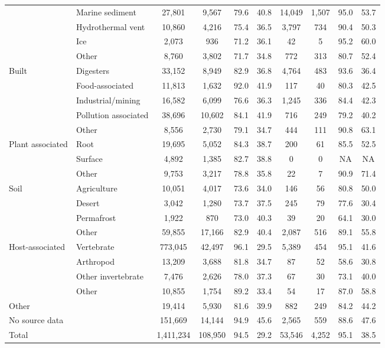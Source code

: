 \documentclass[]{article}
\begin{document}
\begin{table}[!ht]
{\begin{tabular}{llcccccccc}
   & Marine sediment &    27,801 &   9,567 & 79.6 & 40.8 & 14,049 & 1,507 &  95.0 &  53.7 \\
   & Hydrothermal vent &    10,860 &   4,216 & 75.4 & 36.5 &  3,797 &   734 &  90.4 &  50.3 \\
   & Ice &     2,073 &     936 & 71.2 & 36.1 &     42 &     5 &  95.2 &  60.0 \\
   & Other &     8,760 &   3,802 & 71.7 & 34.8 &    772 &   313 &  80.7 &  52.4 \\
  Built & Digesters &    33,152 &   8,949 & 82.9 & 36.8 &  4,764 &   483 &  93.6 &  36.4 \\
   & Food-associated &    11,813 &   1,632 & 92.0 & 41.9 &    117 &    40 &  80.3 &  42.5 \\
   & Industrial/mining &    16,582 &   6,099 & 76.6 & 36.3 &  1,245 &   336 &  84.4 &  42.3 \\
   & Pollution associated &    38,696 &  10,602 & 84.1 & 41.9 &    716 &   249 &  79.2 &  40.2 \\
   & Other &     8,556 &   2,730 & 79.1 & 34.7 &    444 &   111 &  90.8 &  63.1 \\
  Plant associated & Root &    19,695 &   5,052 & 84.3 & 38.7 &    200 &    61 &  85.5 &  52.5 \\
   & Surface &     4,892 &   1,385 & 82.7 & 38.8 &      0 &     0 &    NA &    NA \\
   & Other &     9,753 &   3,217 & 78.8 & 35.8 &     22 &     7 &  90.9 &  71.4 \\
  Soil & Agriculture &    10,051 &   4,017 & 73.6 & 34.0 &    146 &    56 &  80.8 &  50.0 \\
   & Desert &     3,042 &   1,280 & 73.7 & 37.5 &    245 &    79 &  77.6 &  30.4 \\
   & Permafrost &     1,922 &     870 & 73.0 & 40.3 &     39 &    20 &  64.1 &  30.0 \\
   & Other &    59,855 &  17,166 & 82.9 & 40.4 &  2,087 &   516 &  89.1 &  55.8 \\
  Host-associated & Vertebrate &   773,045 &  42,497 & 96.1 & 29.5 &  5,389 &   454 &  95.1 &  41.6 \\
   & Arthropod &    13,209 &   3,688 & 81.8 & 34.7 &     87 &    52 &  58.6 &  30.8 \\
   & Other invertebrate &     7,476 &   2,626 & 78.0 & 37.3 &     67 &    30 &  73.1 &  40.0 \\
   & Other &    10,855 &   1,754 & 89.2 & 33.4 &     54 &    17 &  87.0 &  58.8 \\
  Other &  &    19,414 &   5,930 & 81.6 & 39.9 &    882 &   249 &  84.2 &  44.2 \\
  No source data &  &   151,669 &  14,144 & 94.9 & 45.6 &  2,565 &   559 &  88.6 &  47.6 \\
   \hline
Total &  & 1,411,234 & 108,950 & 94.5 & 29.2 & 53,546 & 4,252 &  95.1 &  38.5 \\
   \hline
\end{tabular}
}
\end{table}
\end{document}
